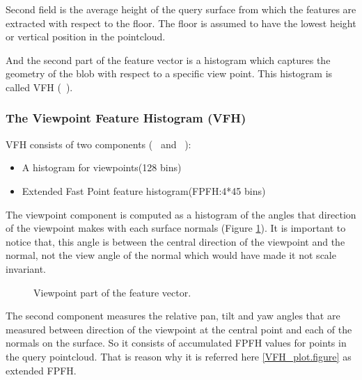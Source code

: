 Second field is the average height of the query surface from which the features are extracted with respect to the 
floor.
The floor is assumed to have the lowest height or vertical position in the pointcloud.
 
And the second part of the feature vector is a histogram which captures the geometry of the blob with respect to a specific view point.
This histogram is called VFH (~\cite{5651280}).

\subsubsection*{The Viewpoint Feature Histogram (VFH)}
\label{VFH.ssec}
 
VFH consists of two components (~\cite{VFH_Definition} and ~\cite{5651280}):

\begin{itemize}
 \item A histogram for viewpoints(128 bins)
 \item Extended Fast Point feature histogram(FPFH:4*45 bins)
\end{itemize}

The viewpoint component is computed as a histogram of the angles that direction of the viewpoint  makes with each surface
normals (Figure \ref{VFH_ViewPoint_component.figure}). 
It is important to notice that, this angle is between the central direction of the viewpoint and the normal, not the view angle of
the normal which would have made it not scale invariant. 

\begin{figure}[t]
  \caption[ViewPoint Component of VFH]
  {Viewpoint part of the feature vector.\cite{VFH_Definition}}
  \label{VFH_ViewPoint_component.figure}
\end{figure}

The second component measures the relative pan, tilt and yaw angles that are measured between direction of 
the viewpoint at the central point and each of the normals on the surface. 
So it consists of accumulated FPFH values for points in the query pointcloud.
That is reason why it is referred here \ref{VFH_plot.figure} as extended FPFH.


